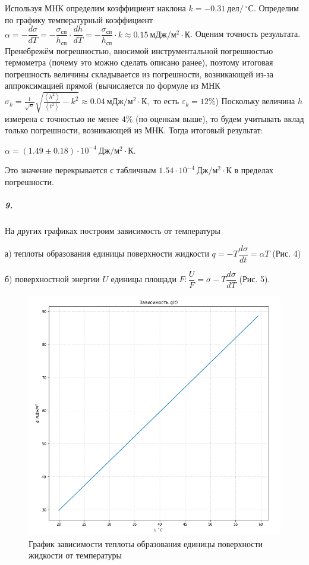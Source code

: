 \documentclass[a4paper,12pt]{article}
\begin{document}
Используя МНК определим коэффициент наклона $k = -0.31 ~ дел/~^\circ С$. 
 Определим по графику температурный коэффициент  $\alpha = - \dfrac{d\sigma}{dT} = -\dfrac{\sigma_{сп}}{h_{сп}}\cdot \dfrac{d h}{d T} = -\dfrac{\sigma_{сп}}{h_{сп}}\cdot k \approx 0.15 ~мДж / м^2 \cdot К$. Оценим точность результата. Пренебрежём погрешностью, вносимой инструментальной погрешностью термометра (почему это можно сделать описано ранее), поэтому итоговая погрешность величины складывается из погрешности, возникающей из-за аппроксимацией прямой (вычисляется по формуле из МНК $\sigma_k = \frac{1}{\sqrt{n}}\sqrt{\frac{\left< h^2\right>}{\left< t^2\right>} - k^2} \approx 0.04~мДж / м^2 \cdot К,$  то есть $\varepsilon_k =  12 \%$) Поскольку величина $h$ измерена с точностью не менее $4\%$ (по оценкам выше), то будем учитывать вклад только погрешности, возникающей из МНК. Тогда итоговый результат:
 
 $
\alpha  =( 1.49 \pm 0.18)  \cdot 10^{-4}~Дж / м^2 \cdot К.
 $
 
 Это значение перекрывается с табличным $1.54 \cdot 10^{-4} ~Дж / м^2\cdot К$ в пределах погрешности. 

\subparagraph*{9.}На других графиках построим зависимость от температуры 


а) теплоты образования единицы поверхности жидкости $q=-T\dfrac{d\sigma}{dt} = \alpha T$ (Рис. 4) 






б) поверхностной энергии $U$ единицы площади $F:   \dfrac{U}{F}= \sigma - T\dfrac{d\sigma}{dT}$ (Рис. 5). 









\newpage

\begin{figure}[h!]
	\centering 
	\includegraphics[scale=0.57]{3.jpg} 
	\caption{График зависимости теплоты образования единицы поверхности жидкости от температуры} 
\end{figure}
\end{document}
